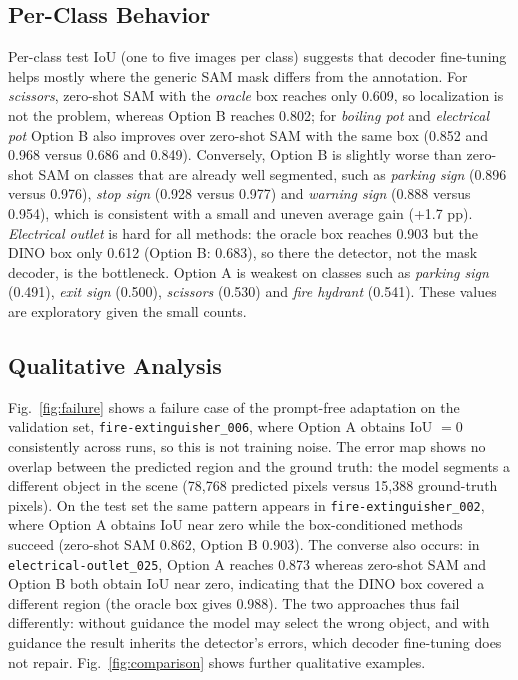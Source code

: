 \documentclass[conference]{IEEEtran}
\begin{document}
\subsection{Per-Class Behavior}

Per-class test IoU (one to five images per class) suggests that decoder fine-tuning helps mostly where the generic SAM mask differs from the annotation. For \emph{scissors}, zero-shot SAM with the \emph{oracle} box reaches only 0.609, so localization is not the problem, whereas Option B reaches 0.802; for \emph{boiling pot} and \emph{electrical pot} Option B also improves over zero-shot SAM with the same box (0.852 and 0.968 versus 0.686 and 0.849). Conversely, Option B is slightly worse than zero-shot SAM on classes that are already well segmented, such as \emph{parking sign} (0.896 versus 0.976), \emph{stop sign} (0.928 versus 0.977) and \emph{warning sign} (0.888 versus 0.954), which is consistent with a small and uneven average gain (+1.7 pp). \emph{Electrical outlet} is hard for all methods: the oracle box reaches 0.903 but the DINO box only 0.612 (Option B: 0.683), so there the detector, not the mask decoder, is the bottleneck. Option A is weakest on classes such as \emph{parking sign} (0.491), \emph{exit sign} (0.500), \emph{scissors} (0.530) and \emph{fire hydrant} (0.541). These values are exploratory given the small counts.

\subsection{Qualitative Analysis}

Fig.~\ref{fig:failure} shows a failure case of the prompt-free adaptation on the validation set, \texttt{fire-extinguisher\_006}, where Option A obtains IoU $=0$ consistently across runs, so this is not training noise. The error map shows no overlap between the predicted region and the ground truth: the model segments a different object in the scene (78{,}768 predicted pixels versus 15{,}388 ground-truth pixels). On the test set the same pattern appears in \texttt{fire-extinguisher\_002}, where Option A obtains IoU near zero while the box-conditioned methods succeed (zero-shot SAM 0.862, Option B 0.903). The converse also occurs: in \texttt{electrical-outlet\_025}, Option A reaches 0.873 whereas zero-shot SAM and Option B both obtain IoU near zero, indicating that the DINO box covered a different region (the oracle box gives 0.988). The two approaches thus fail differently: without guidance the model may select the wrong object, and with guidance the result inherits the detector's errors, which decoder fine-tuning does not repair. Fig.~\ref{fig:comparison} shows further qualitative examples.
\end{document}
